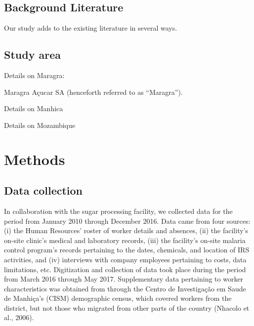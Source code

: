 \documentclass[]{article}
\begin{document}
\subsection{Background Literature}\label{background-literature}


Our study adds to the existing literature in several ways.

\subsection{Study area}\label{study-area}

Details on Maragra:

Maragra Açucar SA (henceforth referred to as ``Maragra'').

Details on Manhica

Details on Mozambique

\section{Methods}\label{methods}

\subsection{Data collection}\label{data-collection}

In collaboration with the sugar processing facility, we collected data
for the period from January 2010 through December 2016. Data came from
four sources: (i) the Human Resources' roster of worker details and
absences, (ii) the facility's on-site clinic's medical and laboratory
records, (iii) the facility's on-site malaria control program's records
pertaining to the dates, chemicals, and location of IRS activities, and
(iv) interviews with company employees pertaining to costs, data
limitations, etc. Digitization and collection of data took place during
the period from March 2016 through May 2017. Supplementary data
pertaining to worker characteristics was obtained from through the
Centro de Investigação em Saude de Manhiça's (CISM) demographic census,
which covered workers from the district, but not those who migrated from
other parts of the country (Nhacolo et al., 2006).
\end{document}
